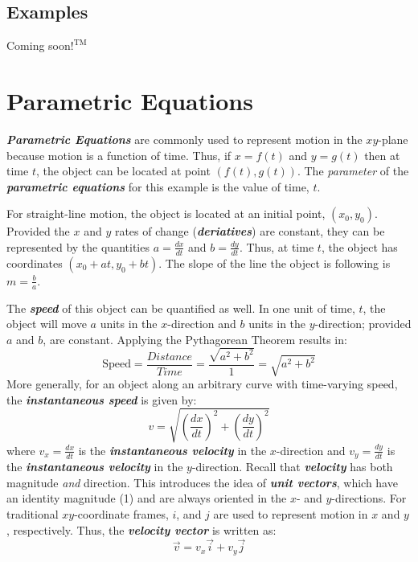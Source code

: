\begin{center}
\section*{\small Examples}
Coming soon$!^{\text{TM}}$
\end{center}

\section{Parametric Equations}
\textbf{\textit{Parametric Equations}} are commonly used to represent motion in the $xy$-plane because motion is a function of time. Thus, if $x = f(t)$ and $y = g(t)$ then at time $t$, the object can be located at point $\left(f(t), g(t)\right)$. The \textit{parameter} of the \textbf{\textit{parametric equations}} for this example is the value of time, $t$.

\vspace{0.1in}
For straight-line motion, the object is located at an initial point, $\left(x_0, y_0\right)$. Provided the $x$ and $y$ rates of change (\textbf{\textit{deriatives}}) are constant, they can be represented by the quantities $a = \frac{dx}{dt}$ and $b = \frac{dy}{dt}$. Thus, at time $t$, the object has coordinates $\left(x_0 + at, y_0 + bt\right)$. The slope of the line the object is following is $m = \frac{b}{a}$.

\vspace{0.1in}
The \textbf{\textit{speed}} of this object can be quantified as well. In one unit of time, $t$, the object will move $a$ units in the $x$-direction and $b$ units in the $y$-direction; provided $a$ and $b$, are constant. Applying the Pythagorean Theorem results in:
%
\begin{equation}
\text{Speed} = \frac{Distance}{Time} = \frac{\sqrt{a^2 + b^2}}{1} = \sqrt{a^2 + b^2}
\end{equation}
%
More generally, for an object along an arbitrary curve with time-varying speed, the \textbf{\textit{instantaneous speed}} is given by:
%
\begin{equation}
v = \sqrt{\left(\frac{dx}{dt}\right)^2 + \left(\frac{dy}{dt}\right)^2}
\end{equation}
%
where $v_x = \frac{dx}{dt}$ is the \textbf{\textit{instantaneous velocity}} in the $x$-direction and $v_y = \frac{dy}{dt}$ is the \textbf{\textit{instantaneous velocity}} in the $y$-direction. Recall that \textbf{\textit{velocity}} has both magnitude \textit{and} direction. This introduces the idea of \textbf{\textit{unit vectors}}, which have an identity magnitude (1) and are always oriented in the $x$- and $y$-directions. For traditional $xy$-coordinate frames, $i$, and $j$ are used to represent motion in $x$ and $y$, respectively. Thus, the 
\textbf{\textit{velocity vector}} is written as:
%
\begin{equation}
\overrightarrow{v} = v_x \overrightarrow{i} + v_y \overrightarrow{j}
\end{equation}
%


